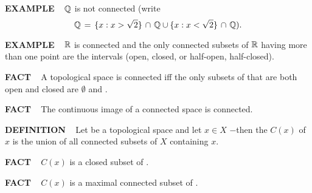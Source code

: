 \vspace{0.1cm}


\begin{x}{\small\bf EXAMPLE} \ %
$\mathbb{Q}$ is not connected (write
\[
\mathbb{Q} \hspace{0.05cm} = \hspace{0.05cm} \{x: x > \sqrt{2}\} \hspace{0.05cm} \cap \hspace{0.05cm} \mathbb{Q} \cup \{x: x < \sqrt{2}\} \hspace{0.05cm} \cap \hspace{0.05cm} \mathbb{Q}). 
\]
\end{x}

\vspace{0.1cm}

\begin{x}{\small\bf EXAMPLE} \ %
$\mathbb{R}$ is connected and the only connected subsets of $\mathbb{R}$ having more than one point are the intervals 
(open, closed, or half-open, half-closed).
\end{x}

\vspace{0.1cm}

\begin{x}{\small\bf FACT} \ %
A topological space \mX is connected iff the only subsets of \mX that are both open and closed are $\emptyset$ and \mX.
\end{x}

\vspace{0.1cm}

\begin{x}{\small\bf FACT} \ %
The continuous image of a connected space is connected.
\end{x}

\vspace{0.1cm}

\begin{x}{\small\bf DEFINITION} \ %
Let \mX be a topological space and let $x \in X$ $-$then the 
$C(x)$ of $x$ is the union of all connected subsets of $X$ containing $x$.
\end{x}

\vspace{0.1cm}

\begin{x}{\small\bf FACT} \ %
$C(x)$ is a closed subset of \mX.
\end{x}

\vspace{0.1cm}

\begin{x}{\small\bf FACT} \ %
$C(x)$ is a maximal connected subset of \mX.
\end{x}

\vspace{0.1cm}

